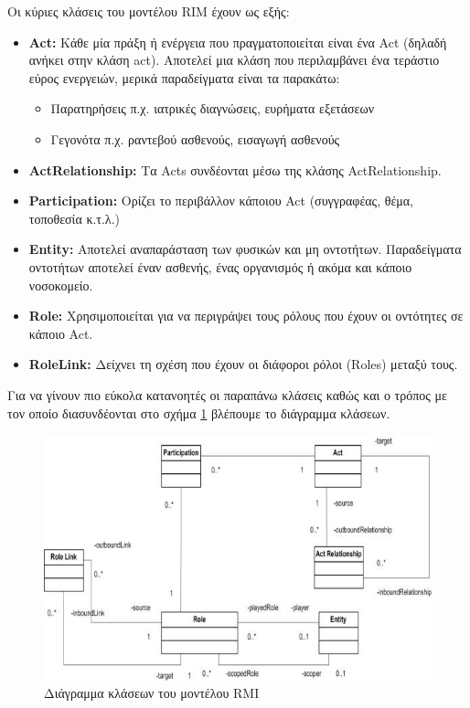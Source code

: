 	Οι κύριες κλάσεις του μοντέλου RIM έχουν ως εξής\cite{gunther2006hl7}:
	\begin{itemize}
		\item \textbf{Act: } Κάθε μία πράξη ή ενέργεια που πραγματοποιείται είναι ένα Act (δηλαδή ανήκει στην κλάση act). Αποτελεί μια κλάση που περιλαμβάνει ένα τεράστιο εύρος ενεργειών, μερικά παραδείγματα είναι τα παρακάτω:
		\begin{itemize}
			\item Παρατηρήσεις π.χ. ιατρικές διαγνώσεις, ευρήματα εξετάσεων
			\item Γεγονότα π.χ. ραντεβού ασθενούς, εισαγωγή ασθενούς 
		\end{itemize}
		\item \textbf{ActRelationship: } Τα Acts συνδέονται μέσω της κλάσης ActRelationship.
		\item \textbf{Participation: } Ορίζει το περιβάλλον κάποιου Act (συγγραφέας, θέμα, τοποθεσία κ.τ.λ.)
		\item \textbf{Entity: } Αποτελεί αναπαράσταση των φυσικών και μη οντοτήτων. Παραδείγματα οντοτήτων αποτελεί έναν ασθενής, ένας οργανισμός ή ακόμα και κάποιο νοσοκομείο.
		\item \textbf{Role: } Χρησιμοποιείται για να περιγράψει τους ρόλους που έχουν οι οντότητες σε κάποιο Act.
		\item \textbf{RoleLink: } Δείχνει τη σχέση που έχουν οι διάφοροι ρόλοι (Roles) μεταξύ τους.
	\end{itemize}
	Για να γίνουν πιο εύκολα κατανοητές οι παραπάνω κλάσεις καθώς και ο τρόπος με τον οποίο διασυνδέονται στο σχήμα \ref{fig:RMI_class_model} βλέπουμε το διάγραμμα κλάσεων\cite{gunther2006hl7}.
	\begin{figure}[h]
	    \centering
	    \includegraphics[width=1\textwidth]{RMI_class_model.jpg}
	    \caption{Διάγραμμα κλάσεων του μοντέλου RMI}
	    \label{fig:RMI_class_model}
	\end{figure}		
		
